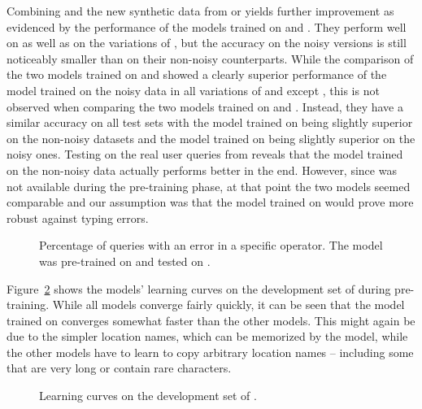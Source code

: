 Combining \nlmtwoone{} and the new synthetic data from \nlmthreea{} or
\nlmthreeb{} yields further improvement as evidenced by the performance of the
models trained on \nlmthreenormal{} and \nlmthree{}. They perform well on
\nlmtwoone{} as well as on the variations of \nlmthree{}, but the accuracy on
the noisy versions is still noticeably smaller than on their non-noisy
counterparts. While the comparison of the two models trained on \nlmthreea{} and
\nlmthreeb{} showed a clearly superior performance of the model trained on the
noisy data in all variations of \nlmtwo{} and \nlmthree{} except \nlmthreea{},
this is not observed when comparing the two models trained on \nlmthreenormal{}
and \nlmthree{}. Instead, they have a similar accuracy on all test sets with the
model trained on \nlmthreenormal{} being slightly superior on the non-noisy
datasets and the model trained on \nlmthree{} being slightly superior on the
noisy ones. Testing on the real user queries from \nlmfour{} reveals that the
model trained on the non-noisy data actually performs better in the end.
However, since \nlmfour{} was not available during the pre-training phase, at
that point the two models seemed comparable and our assumption was that the
model trained on \nlmthreeb{} would prove more robust against typing errors.

\begin{figure}[h]
  \centering
  \resizebox{\textwidth}{!}{}
  \caption[Errors when pre-trained on \nlmthree{}]{Percentage of queries with an
    error in a specific operator. The model was pre-trained on \nlmapsthree{}
    and tested on \nlmapsfour{}.}
  \label{fig:v3-errors}
\end{figure}

Figure~\ref{fig:pre-trained-learning-curve} shows the models’ learning curves on
the development set of \nlmthree{} during pre-training. While all models
converge fairly quickly, it can be seen that the model trained on \nlmtwoone{}
converges somewhat faster than the other models. This might again be due to the
simpler location names, which can be memorized by the model, while the other
models have to learn to copy arbitrary location names – including some that are
very long or contain rare characters.

\begin{figure}[h]
  \centering
  \resizebox{\textwidth}{!}{}
  \caption[Pre-training learning curves]{Learning curves on the development set
    of \nlmapsthree{}.}
  \label{fig:pre-trained-learning-curve}
\end{figure}


